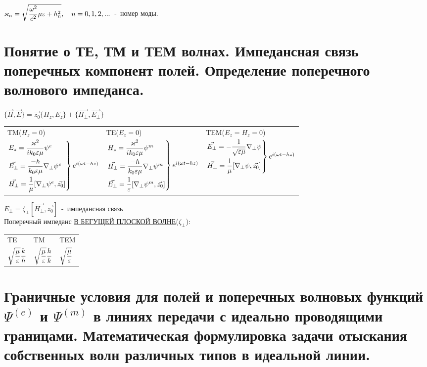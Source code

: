 \begin{multicols*}{2}
		$\varkappa_n=\sqrt{\dfrac{\omega^2}{c^2}\mu\varepsilon+h_n^2}, \quad n=0,1,2,...$~-~номер моды.
		
		\section{Понятие о ТЕ, ТМ и ТЕМ волнах. Импедансная связь поперечных компонент полей. Определение поперечного волнового импеданса. }
		
		$\{\vec{H},\vec{E}\}=\vec{z_0}\{{H_z},{E_z}\}+\{\vec{H_\perp},\vec{E_\perp}\}$ \\
		\begin{tabular}{l l l}
			TM($H_z=0$) & TE($E_z=0$) & TEM($E_z=H_z=0$) \\
			$\begin{rcases}
				E_z=\dfrac{\varkappa^2}{ik_0\varepsilon\mu}\psi^e \\
				\vec{E_\perp} = \dfrac{-h}{k_0\varepsilon\mu}\nabla_\perp\psi^e \\
				\vec{H_\perp}=\dfrac1{\mu}[\nabla_\perp\psi^e,\vec{z_0}]
			\end{rcases} e^{i(\omega t-hz)}$ & 
			$\begin{rcases}
				H_z=\dfrac{\varkappa^2}{ik_0\varepsilon\mu}\psi^m \\
				\vec{H_\perp} = \dfrac{-h}{k_0\varepsilon\mu}\nabla_\perp\psi^m \\
				\vec{E_\perp}=\dfrac1{\varepsilon}[\nabla_\perp\psi^m,\vec{z_0}]
			\end{rcases} e^{i(\omega t-hz)}$ & 
			$\begin{rcases}
				\vec{E_\perp} =-\dfrac1{\sqrt{\varepsilon\mu}}\nabla_\perp\psi \\
				\vec{H_\perp}=\dfrac1{\mu}[\nabla_\perp\psi,\vec{z_0}]
			\end{rcases} e^{i(\omega t-hz)}$ \\
		\end{tabular}
		$E_\perp=\zeta_\perp[\vec{H_\perp},\vec{z_0}]$~-~импедансная связь \\
		Поперечный импеданс \underline{В БЕГУЩЕЙ ПЛОСКОЙ ВОЛНЕ}($\zeta_\perp$): \\
		\begin{tabular}{l l l}
			TE & TM & TEM \\
			$\sqrt{\dfrac{\mu}{\varepsilon}}\dfrac kh$ & $\sqrt{\dfrac{\mu}{\varepsilon}}\dfrac hk$ & $\sqrt{\dfrac{\mu}{\varepsilon}}$ \\
		\end{tabular}
		
		\section{Граничные условия для полей и поперечных волновых функций $\Psi^{(e)}$ и $\Psi^{(m)}$ в линиях передачи с идеально проводящими границами. Математическая формулировка задачи отыскания собственных волн различных типов в идеальной линии.}
		

\end{multicols*}
